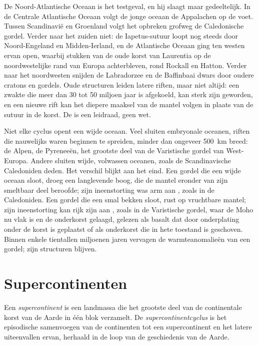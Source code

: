 De Noord-Atlantische Oceaan is het testgeval, en hij slaagt maar gedeeltelijk. In de Centrale Atlantische Oceaan volgt de
jonge oceaan de Appalachen op de voet. Tussen Scandinavië en Groenland volgt het opbreken
grofweg de Caledonische gordel. Verder naar het zuiden niet: de Iapetus-sutuur loopt nog steeds
door Noord-Engeland en Midden-Ierland, en de Atlantische Oceaan ging ten westen ervan open, waarbij
stukken van de oude korst van Laurentia op de noordwestelijke rand van Europa achterbleven, rond Rockall en Hatton.
Verder naar het noordwesten snijden de Labradorzee en de Baffinbaai dwars door oudere cratons en
gordels. Oude structuren leiden latere riften, maar niet altijd: een zwakte die meer dan 30 tot 50 miljoen jaar
is afgekoeld, kan sterk zijn geworden, en een nieuwe rift kan het diepere
maaksel van de mantel volgen in plaats van de sutuur in de korst. De  is een leidraad, geen wet.

Niet elke cyclus opent een wijde oceaan. Veel  sluiten embryonale oceanen, riften die nauwelijks
waren beginnen te spreiden, minder dan ongeveer \qty{500}{km} breed: de Alpen, de Pyreneeën, het grootste deel van de
Varistische gordel van West-Europa. Andere sluiten wijde, volwassen oceanen, zoals de Scandinavische
Caledoniden deden. Het verschil blijkt aan het eind. Een gordel die een wijde oceaan sloot, droeg een
langlevende boog, die de mantel eronder van zijn smeltbaar deel beroofde; zijn ineenstorting was arm aan
, zoals in de Caledoniden. Een gordel die een smal bekken sloot, rust op vruchtbare mantel; zijn
ineenstorting kan rijk zijn aan , zoals in de Varistische gordel, waar de Moho nu vlak is en de
onderkorst gelaagd, gelezen als basalt dat door onderplating onder de korst is geplaatst of als onderkorst die in hete toestand
is geschoven. Binnen enkele tientallen miljoenen jaren vervagen de
warmteanomalieën van een gordel; zijn structuren blijven.

\section{Supercontinenten}\label{sec:b2:wilson-cycle:supercontinents}

\begin{definition}\label{def:b2:wilson-cycle:supercontinent}
Een \emph{supercontinent} is een landmassa die het grootste deel van de continentale
korst van de Aarde in één blok verzamelt. De \emph{supercontinentcyclus} is het
episodische samenvoegen van de continenten tot een supercontinent en het latere
uiteenvallen ervan, herhaald in de loop van de geschiedenis van de Aarde.
\end{definition}

